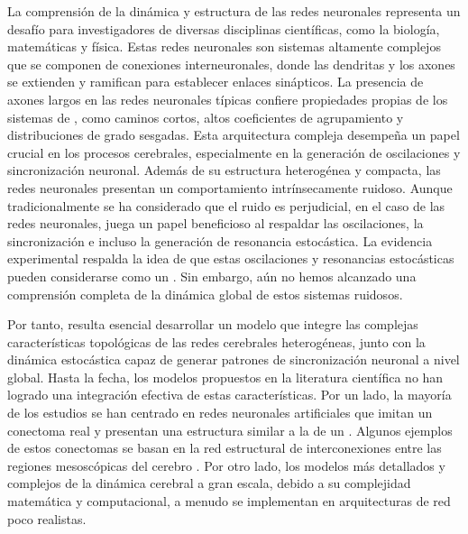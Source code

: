 La comprensión de la dinámica y estructura de las redes neuronales representa un desafío para investigadores de diversas disciplinas científicas, como la biología, matemáticas y física. Estas redes neuronales son sistemas altamente complejos que se componen de conexiones interneuronales, donde las dendritas y los axones se extienden y ramifican para establecer enlaces sinápticos. La presencia de axones largos en las redes neuronales típicas confiere propiedades propias de los sistemas de , como caminos cortos, altos coeficientes de agrupamiento  y distribuciones de grado sesgadas. Esta arquitectura compleja desempeña un papel crucial en los procesos cerebrales, especialmente en la generación de oscilaciones y sincronización neuronal. Además de su estructura heterogénea y compacta, las redes neuronales presentan un comportamiento intrínsecamente ruidoso. Aunque tradicionalmente se ha considerado que el ruido es perjudicial, en el caso de las redes neuronales, juega un papel beneficioso al respaldar las oscilaciones, la sincronización e incluso la generación de resonancia estocástica. La evidencia experimental respalda la idea de que estas oscilaciones y resonancias estocásticas pueden considerarse como un  \cite{goltsev_stochastic_2010}. Sin embargo, aún no hemos alcanzado una comprensión completa de la dinámica global de estos sistemas ruidosos.


Por tanto, resulta esencial desarrollar un modelo que integre las complejas características topológicas de las redes cerebrales heterogéneas, junto con la dinámica estocástica capaz de generar patrones de sincronización neuronal a nivel global. Hasta la fecha, los modelos propuestos en la literatura científica no han logrado una integración efectiva de estas características. Por un lado, la mayoría de los estudios se han centrado en redes neuronales artificiales que imitan un conectoma real y presentan una estructura similar a la de un . Algunos ejemplos de estos conectomas se basan en la red estructural de interconexiones entre las regiones mesoscópicas del cerebro \cite{hagmann_mapping_2008,copelli_excitable_2007,rocha_homeostatic_2018}. Por otro lado, los modelos más detallados y complejos de la dinámica cerebral a gran escala, debido a su complejidad matemática y computacional, a menudo se implementan en arquitecturas de red poco realistas.


